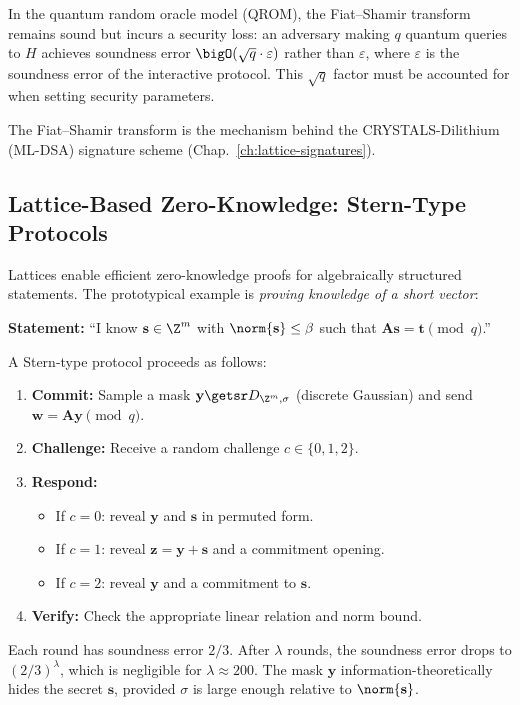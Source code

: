 \begin{definition}
\label{def:pq-fiat-shamir}
In the quantum random oracle model (QROM), the Fiat--Shamir transform remains sound but incurs a security loss: an adversary making $q$ quantum queries to $H$ achieves soundness error $\bigO(\sqrt{q} \cdot \varepsilon)$ rather than $\varepsilon$, where $\varepsilon$ is the soundness error of the interactive protocol.  This $\sqrt{q}$ factor must be accounted for when setting security parameters.
\end{definition}

The Fiat--Shamir transform is the mechanism behind the CRYSTALS-Dilithium (ML-DSA) signature scheme (Chap.~\ref{ch:lattice-signatures}).


\subsection{Lattice-Based Zero-Knowledge: Stern-Type Protocols}
\label{subsec:lattice-zk}

Lattices enable efficient zero-knowledge proofs for algebraically structured statements.  The prototypical example is \emph{proving knowledge of a short vector}:

\begin{example}
\label{ex:stern-proof}
\textbf{Statement:} ``I know $\mathbf{s} \in \Z^m$ with $\norm{\mathbf{s}} \leq \beta$ such that $\mathbf{A}\mathbf{s} = \mathbf{t} \pmod{q}$.''

A Stern-type protocol proceeds as follows:
\begin{enumerate}
\item \textbf{Commit:} Sample a mask $\mathbf{y} \getsr D_{\Z^m, \sigma}$ (discrete Gaussian) and send $\mathbf{w} = \mathbf{A}\mathbf{y} \pmod{q}$.
\item \textbf{Challenge:} Receive a random challenge $c \in \{0, 1, 2\}$.
\item \textbf{Respond:}
  \begin{itemize}
  \item If $c = 0$: reveal $\mathbf{y}$ and $\mathbf{s}$ in permuted form.
  \item If $c = 1$: reveal $\mathbf{z} = \mathbf{y} + \mathbf{s}$ and a commitment opening.
  \item If $c = 2$: reveal $\mathbf{y}$ and a commitment to $\mathbf{s}$.
  \end{itemize}
\item \textbf{Verify:} Check the appropriate linear relation and norm bound.
\end{enumerate}
Each round has soundness error $2/3$.  After $\lambda$ rounds, the soundness error drops to $(2/3)^\lambda$, which is negligible for $\lambda \approx 200$.  The mask $\mathbf{y}$ information-theoretically hides the secret $\mathbf{s}$, provided $\sigma$ is large enough relative to $\norm{\mathbf{s}}$.
\end{example}

